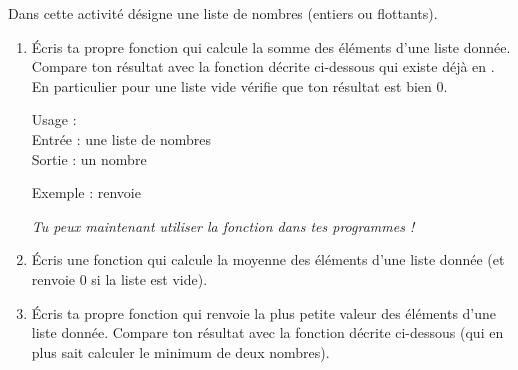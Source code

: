\documentclass[11pt,class=report,crop=false]{standalone}
\begin{document}
\newcommand{\badletter}[1]{\underline{\textcolor{red}{#1}}}







\begin{activite}


Dans cette activité  désigne une liste de nombres (entiers ou flottants). 

\begin{enumerate}
  \item Écris ta propre fonction  qui calcule la somme des éléments d'une liste donnée.
  Compare ton résultat avec la fonction  décrite ci-dessous qui existe déjà en \Python{}. En particulier pour une liste vide vérifie que ton résultat est bien $0$. 
  
  
  \begin{fonctionpython}
   Usage : \\
   Entrée : une liste de nombres\\
   Sortie : un nombre
  
  \medskip
     
   Exemple :  renvoie 
  \end{fonctionpython}   
  
  \emph{Tu peux maintenant utiliser la fonction  dans tes programmes !}
  
  
  \item Écris une fonction  qui calcule la moyenne des éléments d'une liste donnée (et renvoie $0$ si la liste est vide).
  
  \item Écris ta propre fonction  qui renvoie la plus petite valeur des éléments d'une liste donnée. Compare ton résultat avec la fonction \Python{}  décrite ci-dessous (qui en plus sait calculer le minimum de deux nombres).
  

\end{enumerate}
\end{activite}
\end{document}
